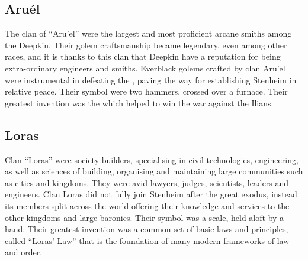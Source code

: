 \subsection{Aru\'el}
\label{sec:Aru'el}
The clan of ``Aru'el'' were the largest and most proficient arcane smiths among
the Deepkin. Their golem craftsmanship became legendary, even among other
races, and it is thanks to this clan that Deepkin have a reputation for being
extra-ordinary engineers and smiths. Everblack golems crafted by clan Aru'el
were instrumental in defeating the , paving the way for
establishing Stenheim in relative peace. Their symbol were two hammers,
crossed over a furnace. Their greatest invention was the
 which helped to win the war against the Ilians.

\subsection{Loras}
\label{sec:Loras}
Clan ``Loras'' were society builders, specialising in civil technologies,
engineering, as well as sciences of building, organising and maintaining large
communities such as cities and kingdoms. They were avid lawyers, judges,
scientists, leaders and engineers. Clan Loras did not fully join Stenheim
after the great exodus, instead its members split across the world offering
their knowledge and services to the other kingdoms and large baronies. Their
symbol was a scale, held aloft by a hand. Their greatest invention was a
common set of basic laws and principles, called ``Loras' Law'' that is the
foundation of many modern frameworks of law and order.
